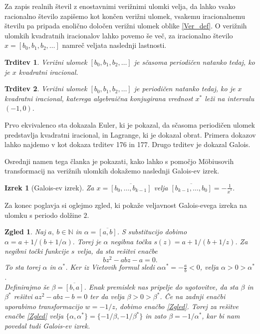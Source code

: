 \documentclass[a4paper,12pt]{article}
\def\N{\mathbb{N}} %
\newtheorem*{izrek}{Izrek}
\newtheorem{trditev}{Trditev}
\newtheorem{zgled}{Zgled}
\begin{document}
Za zapis realnih števil z enostavnimi verižnimi ulomki velja, da lahko vsako racionalno število zapišemo kot končen verižni ulomek, vsakemu iracionalnemu številu pa pripada enolično določen verižni ulomek oblike \eqref{Ver_def}. O verižnih ulomkih kvadratnih iracionalov lahko povemo še več, za iracionalno število $x = [b_0, b_1, b_2, \ldots]$ namreč veljata naslednji lastnosti.
\begin{trditev}
    Verižni ulomek $[b_0, b_1, b_2, \ldots]$ je sčasoma periodičen natanko tedaj, ko je $x$ kvadratni iracional.
\end{trditev}
\begin{trditev}
    Verižni ulomek $[b_0, b_1, b_2, \ldots]$ je periodičen natanko tedaj, ko je $x$ kvadratni iracional, katerega algebraična konjugirana vrednost $x^*$ leži na intervalu $(-1, 0)$.
\end{trditev} 
Prvo ekvivalenco sta dokazala Euler, ki je pokazal, da sčasoma periodičen ulomek predstavlja kvadratni iracional, in Lagrange, ki je dokazal obrat. Primera dokazov lahko najdemo v \cite{Hardy} kot dokaza trditev 176 in 177. Drugo trditev je dokazal Galois.

Osrednji namen tega članka je pokazati, kako lahko s pomočjo M\"obiusovih transformacij na verižnih ulomkih dokažemo naslednji Galois-ev izrek.

\begin{izrek}[Galois-ev izrek]
    \label{Galois}
	Za $x = \overline{[b_0, \ldots, b_{k-1}]}$ velja $\overline{[b_{k-1}, \ldots, b_0]} = - \frac{1}{x^*}.$
\end{izrek}

Za konec poglavja si oglejmo zgled, ki pokaže veljavnost Galois-evega izreka na ulomku s periodo dolžine $2$.

\begin{zgled}
Naj $a,\ b \in \N$ in $\alpha = \overline{[a, b]}$. S substitucijo dobimo $\alpha = a + 1/(b + 1/\alpha).$ Torej je $\alpha$ negibna točka $s(z) = a + 1/(b + 1/z)$. Za negibni točki funkcije $s$ velja, da sta rešitvi enačbe 
\begin{equation}
    \label{Zgled}
    bz^2 - abz - a = 0.
\end{equation}
To sta torej $\alpha$ in $\alpha^*$. Ker iz Vietovih formul sledi $\alpha\alpha^* = - \frac{a}{b} < 0$, velja $\alpha > 0 > \alpha^*$.\\
Definirajmo še $\beta = \overline{[b, a]}$. Enak premislek nas pripelje do ugotovitve, da sta $\beta$ in $\beta^*$ rešitvi $az^2 - abz - b =0$ ter da velja $\beta > 0 > \beta^*$. Če na zadnji enačbi uporabimo transformacijo $w = - 1 / z$, dobimo enačbo \eqref{Zgled}. Torej za rešitve enačbe \eqref{Zgled} velja $\{\alpha, \alpha^*\} = \{-1/\beta, -1/\beta^*\}$ in zato $\beta = -1/\alpha^*$, kar bi nam povedal tudi Galois-ev izrek.
\end{zgled}
\end{document}
